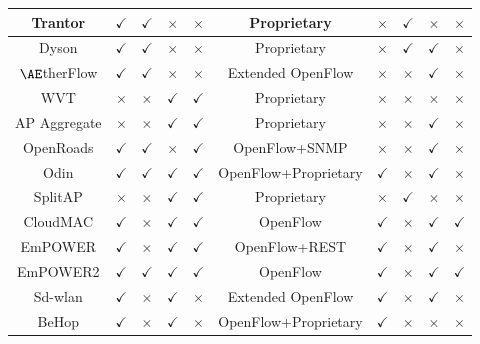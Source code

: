 \begin{table*}
\begin{tabular}{|c|c|c|c|c|c|c|c|c|c|}
		Trantor \cite{Trantor}&\textbf{$\checkmark$}&$\checkmark$&$\times$&$\times$&Proprietary&$\times$&$\checkmark$&$\times$&$\times$\\\hline
		Dyson \cite{Dyson}&$\checkmark$&$\checkmark$&$\times$&$\times$&Proprietary&$\times$&$\checkmark$&$\checkmark$&$\times$\\\hline
		$\AE$therFlow  \cite{AEtherFlow}&$\checkmark$&$\checkmark$&$\times$&$\times$& Extended OpenFlow  &$\times$&$\times$&$\checkmark$&$\times$\\\hline		
		WVT \cite{smith2007wireless}&$\times$&$\times$&$\checkmark$& $\checkmark$ & Proprietary &$\times$&$\times$&$\times$&$\times$\\\hline
		AP Aggregate \cite{nagai2011framework}&$\times$&$\times$&$\checkmark$& $\checkmark$ & Proprietary &$\times$&$\times$&$\checkmark$&$\times$\\\hline
		OpenRoads \cite{Blueprints,yap2010openroads} & $\checkmark$&$\checkmark$&$\times$& $\checkmark$ & OpenFlow+SNMP &$\times$&$\times$&$\checkmark$&$\times$\\\hline
		Odin \cite{Odin,Odin2,OdinThor}&$\checkmark$&$\checkmark$&$\checkmark$&$\checkmark$& OpenFlow+Proprietary &$\checkmark$&$\times$&$\checkmark$&$\times$\\\hline
		SplitAP \cite{SplitAP}&$\times$&$\times$&$\checkmark$&$\checkmark$& Proprietary &$\times$&$\checkmark$&$\times$&$\times$\\\hline		
		CloudMAC \cite{CloudMAC,CloudMAC3}&$\checkmark$&$\times$&$\checkmark$&$\checkmark$& OpenFlow &$\checkmark$&$\times$&$\checkmark$&$\checkmark$\\\hline				
		EmPOWER \cite{EmPOWER}&$\checkmark$&$\times$&$\checkmark$&$\checkmark$& OpenFlow+REST &$\checkmark$&$\times$&$\checkmark$&$\times$\\\hline		
		EmPOWER2 \cite{Primitives}&$\checkmark$&$\checkmark$&$\checkmark$&$\checkmark$& OpenFlow &$\checkmark$&$\times$&$\checkmark$&$\checkmark$\\\hline				
		Sd-wlan \cite{SDWLAN}&$\checkmark$&$\times$&$\checkmark$&$\times$& Extended OpenFlow &$\checkmark$&$\times$&$\checkmark$&$\times$\\\hline
		BeHop \cite{BeHop}&$\checkmark$&$\times$&$\checkmark$&$\times$& OpenFlow+Proprietary &$\checkmark$&$\times$&$\times$&$\times$\\\hline

\end{tabular}
\end{table*}
